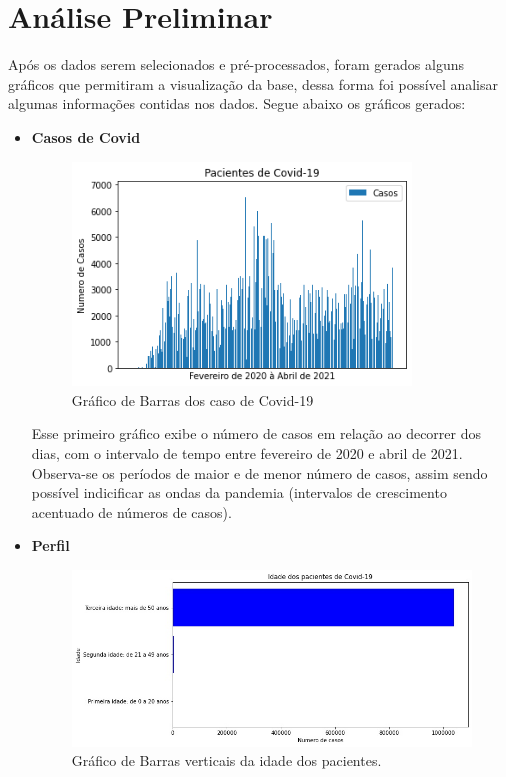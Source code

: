 \documentclass[tcc1]{uftex}
\begin{document}
\chapter{Análise Preliminar}

Após os dados serem selecionados e pré-processados, foram gerados alguns gráficos que permitiram a visualização da base, dessa forma foi possível analisar algumas informações contidas nos dados. Segue abaixo os gráficos gerados:

 \begin{itemize}
 \setlength{\parindent}{1.25cm}
   \item\textbf{Casos de Covid}
   \begin{figure}[h]
    \centering
    \includegraphics[width=9cm]{GBarra.png}%
    \caption{Gráfico de Barras dos caso de Covid-19}
    \end{figure}
    
    Esse primeiro gráfico exibe o número de casos em relação ao decorrer dos dias, com o intervalo de tempo entre fevereiro de 2020 e abril de 2021. Observa-se os períodos de maior e de menor número de casos, assim sendo possível indicificar as ondas da pandemia (intervalos de crescimento acentuado de números de casos). 
   
   \item\textbf{Perfil}
    \begin{figure}[h]
    \centering
    \includegraphics[width=12cm]{Idade.jpg} %
    \caption{Gráfico de Barras verticais da idade dos pacientes.}
    \end{figure}
    

\end{itemize}
\end{document}
